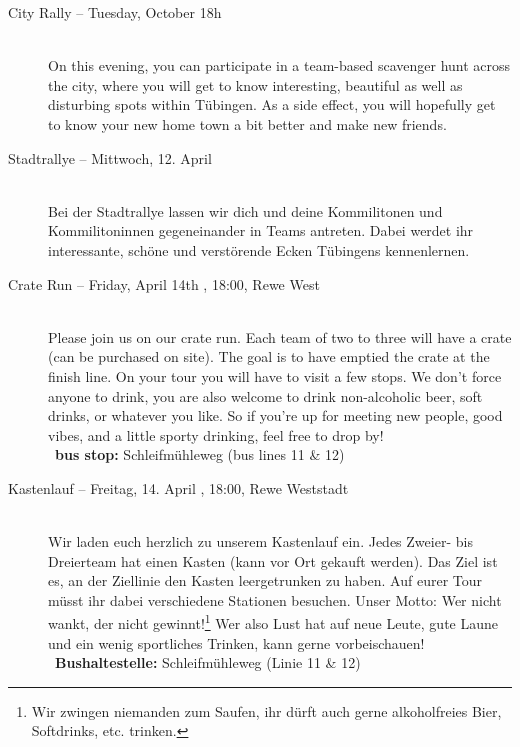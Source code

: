 \begin{description}
\ifml
	\item[City Rally -- Tuesday, October 18h \YEAR]~\\%
	On this evening, you can participate in a team-based scavenger hunt across the city,
	where you will get to know interesting, beautiful as well as disturbing spots within Tübingen.
	As a side effect, you will hopefully get to know your new home town a bit better and make new friends.
\else
	\item[Stadtrallye -- Mittwoch, 12. April \YEAR]~\\%
	Bei der Stadtrallye lassen wir dich und deine Kommilitonen und Kommilitoninnen gegeneinander in Teams antreten.
	Dabei werdet ihr interessante, schöne und verstörende Ecken Tübingens kennenlernen.
\fi


\ifml
\item[Crate Run -- Friday, April 14th \YEAR, 18:00, Rewe West]~\\
Please join us on our crate run.
Each team of two to three will have a crate (can be purchased on site).
The goal is to have emptied the crate at the finish line.
On your tour you will have to visit a few stops.
We don't force anyone to drink, you are also welcome to drink non-alcoholic beer, soft drinks, or whatever you like.
So if you're up for meeting new people, good vibes, and a little sporty drinking, feel free to drop by! \\
~\textbf{bus stop:} Schleifmühleweg (bus lines 11 \& 12)
\else
\item[Kastenlauf -- Freitag, 14. April \YEAR, 18:00, Rewe Weststadt]~\\
Wir laden euch herzlich zu unserem Kastenlauf ein.
Jedes Zweier- bis Dreierteam hat einen Kasten (kann vor Ort gekauft werden).
Das Ziel ist es, an der Ziellinie den Kasten leergetrunken zu haben.
Auf eurer Tour müsst ihr dabei verschiedene Stationen besuchen.
Unser Motto: Wer nicht wankt, der nicht gewinnt!\footnote{Wir zwingen niemanden zum Saufen, ihr dürft auch gerne alkoholfreies Bier, Softdrinks, etc. trinken.}
Wer also Lust hat auf neue Leute, gute Laune und ein wenig sportliches Trinken, kann gerne vorbeischauen! \\
~\textbf{Bushaltestelle:} Schleifmühleweg (Linie 11 \& 12)
\fi


\end{description}
